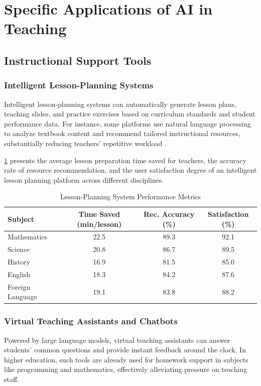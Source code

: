 \section{Specific Applications of AI in Teaching}
\subsection{Instructional Support Tools}
\subsubsection{Intelligent Lesson-Planning Systems}

Intelligent lesson-planning systems can automatically generate lesson plans, teaching slides, and practice exercises based on curriculum standards and student performance data. For instance, some platforms use natural language processing to analyze textbook content and recommend tailored instructional resources, substantially reducing teachers’ repetitive workload \cite{MOUNDRIDOU2024100277}.

\cref{tab:lesson_planning_metrics} presents the average lesson preparation time saved for teachers, the accuracy rate of resource recommendation, and the user satisfaction degree of an intelligent lesson planning platform across different disciplines.

\begin{table}[ht]
	\centering
	\caption{Lesson-Planning System Performance Metrics}
	\label{tab:lesson_planning_metrics}
	\begin{tabular}{lccc}
		\hline
		\textbf{Subject} & \textbf{Time Saved (min/lesson)} & \textbf{Rec. Accuracy (\%)} & \textbf{Satisfaction (\%)} \\
		\hline
		Mathematics      & 22.5 & 89.3 & 92.1 \\
		Science          & 20.8 & 86.7 & 89.5 \\
		History          & 16.9 & 81.5 & 85.0 \\
		English          & 18.3 & 84.2 & 87.6 \\
		Foreign Language & 19.1 & 83.8 & 88.2 \\
		\hline
	\end{tabular}
\end{table}

\subsubsection{Virtual Teaching Assistants and Chatbots}
Powered by large language models, virtual teaching assistants can answer students’ common questions and provide instant feedback around the clock. In higher education, such tools are already used for homework support in subjects like programming and mathematics, effectively alleviating pressure on teaching staff.

